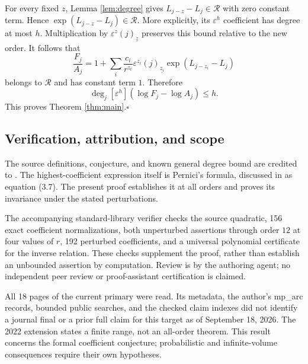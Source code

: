 \documentclass[11pt]{article}
\newcommand{\ff}[2]{(#1)_{\underline{#2}}}
\newcommand{\eps}{\varepsilon}
\begin{document}
For every fixed $z$, Lemma \ref{lem:degree} gives
$L_{j-z}-L_j\in\mathcal R$ with zero constant term.
Hence $\exp(L_{j-z}-L_j)\in\mathcal R$. More explicitly, its
$\eps^h$ coefficient has degree at most $h$. Multiplication by
$\eps^z\ff{j}{z}$ preserves this bound relative to the new order.
It follows that
\[
 \frac{F_j}{A_j}
 =1+\sum_i\frac{c_i}{r^{z_i}}
      \eps^{z_i}\ff{j}{z_i}\exp(L_{j-z_i}-L_j)
\]
belongs to $\mathcal R$ and has constant term $1$.
Therefore
\[
 \deg_j[\eps^h](\log F_j-\log A_j)\le h.
\]
This proves Theorem \ref{thm:main}.\hfill$\square$

\subsection*{Verification, attribution, and scope}
The source definitions, conjecture, and known general degree bound
are credited to \cite{fed}. The highest-coefficient expression itself
is Pernici's formula, discussed in \cite{fed} as equation (3.7).
The present proof establishes it at all orders and proves its
invariance under the stated perturbations.

The accompanying standard-library verifier checks the source quadratic,
156 exact coefficient normalizations, both unperturbed assertions
through order $12$ at four values of $r$, 192 perturbed coefficients,
and a universal polynomial certificate for the inverse relation.
These checks supplement the proof, rather than establish an
unbounded assertion by computation. Review is by the authoring agent;
no independent peer review or proof-assistant certification is claimed.

All 18 pages of the current primary were read. Its metadata, the
author's mp\_arc records, bounded public searches, and the checked
claim indexes did not identify a journal final or a prior full claim
for this target as of September 18, 2026. The 2022 extension
\cite{extension} states a finite range, not an all-order theorem.
This result concerns the formal coefficient conjecture; probabilistic
and infinite-volume consequences require their own hypotheses.
\end{document}
